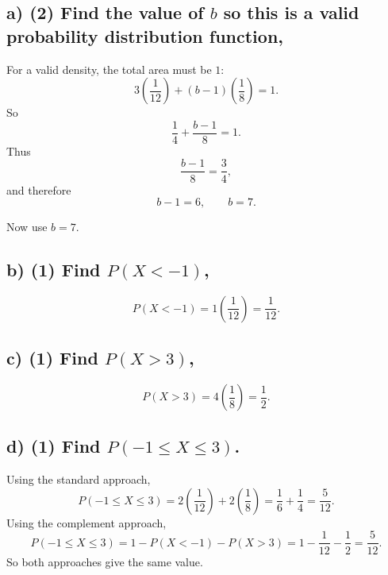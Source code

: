 \subsection*{a) \textbf{(2)} Find the value of $b$ so this is a valid probability distribution function,}
\label{subsec:two-interval-piecewise-uniform-with-unique-variable-endpoint-c2-a}
For a valid density, the total area must be $1$:
\[
3\left(\frac{1}{12}\right)+(b-1)\left(\frac{1}{8}\right)=1.
\]
So
\[
\frac{1}{4}+\frac{b-1}{8}=1.
\]
Thus
\[
\frac{b-1}{8}=\frac{3}{4},
\]
and therefore
\[
b-1=6,
\qquad
b=7.
\]

Now use $b=7$.



\subsection*{b) \textbf{(1)} Find $P(X<-1)$,}
\label{subsec:two-interval-piecewise-uniform-with-unique-variable-endpoint-c2-b}
\[
P(X<-1)=1\left(\frac{1}{12}\right)=\frac{1}{12}.
\]



\subsection*{c) \textbf{(1)} Find $P(X>3)$,}
\label{subsec:two-interval-piecewise-uniform-with-unique-variable-endpoint-c2-c}
\[
P(X>3)=4\left(\frac{1}{8}\right)=\frac{1}{2}.
\]



\subsection*{d) \textbf{(1)} Find $P(-1\le X\le 3)$.}
\label{subsec:two-interval-piecewise-uniform-with-unique-variable-endpoint-c2-d}
Using the standard approach,
\[
P(-1\le X\le 3)=2\left(\frac{1}{12}\right)+2\left(\frac{1}{8}\right)
=\frac{1}{6}+\frac{1}{4}
=\frac{5}{12}.
\]
Using the complement approach,
\[
P(-1\le X\le 3)=1-P(X<-1)-P(X>3)
=1-\frac{1}{12}-\frac{1}{2}
=\frac{5}{12}.
\]
So both approaches give the same value.

